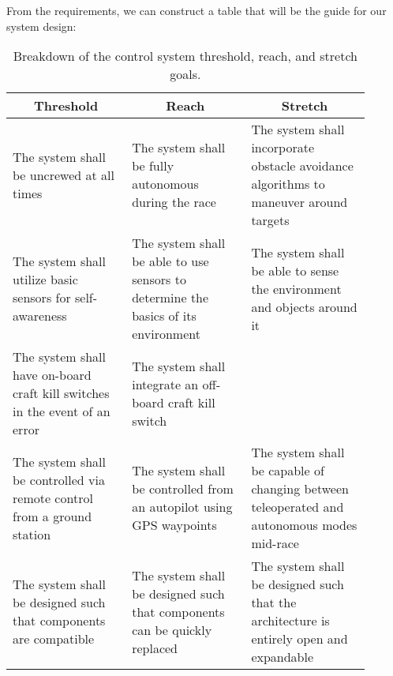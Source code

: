 From the requirements, we can construct a table that will be the guide for our system design:

\begin{table*}[h!]
    \begin{tabular}{p{0.3\linewidth} | p{0.3\linewidth} | p{0.3\linewidth}}
        \toprule
        \multicolumn{1}{c|}{\textbf{Threshold}} & \multicolumn{1}{c}{\textbf{Reach}} & \multicolumn{1}{|c}{\textbf{Stretch}} \\
        \midrule
        The system shall be uncrewed at all times & The system shall be fully autonomous during the race & The system shall incorporate obstacle avoidance algorithms to maneuver around targets \\
        \midrule
        The system shall utilize basic sensors for self-awareness & The system shall be able to use sensors to determine the basics of its environment & The system shall be able to sense the environment and objects around it \\
        \midrule
        The system shall have on-board craft kill switches in the event of an error & The system shall integrate an off-board craft kill switch & \\
        \midrule
        The system shall be controlled via remote control from a ground station & The system shall be controlled from an autopilot using GPS waypoints & The system shall be capable of changing between teleoperated and autonomous modes mid-race \\
        \midrule
        The system shall be designed such that components are compatible & The system shall be designed such that components can be quickly replaced & The system shall be designed such that the architecture is entirely open and expandable \\
        \bottomrule
    \end{tabular}
    \caption{Breakdown of the control system threshold, reach, and stretch goals.}
\end{table*}

